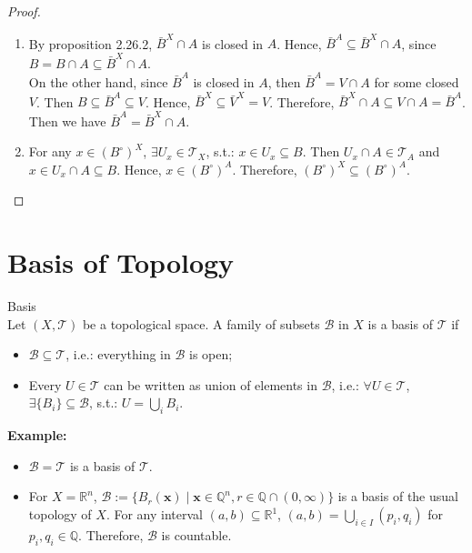 \begin{proof}
    \begin{enumerate}
        \item By proposition 2.26.2, $\bar{B}^X \cap A$ is closed in $A$. Hence, $\bar{B}^A \subseteq \bar{B}^X \cap A$, since $B =B\cap A \subseteq \bar{B}^X \cap A$.\\
        On the other hand, since $\bar{B}^A$ is closed in $A$, then $\bar{B}^A = V\cap A$ for some closed $V$. Then $B \subseteq \bar{B}^A \subseteq V$. Hence, $\bar{B}^X \subseteq \bar{V}^X = V$. Therefore, $\bar{B}^X \cap A \subseteq V \cap A=\bar{B}^A$.\\
        Then we have $\bar{B}^A = \bar{B}^X \cap A$.
        \item For any $x \in (B^\circ)^X$, $\exists U_x \in \mathcal{T}_X$, s.t.: $x\in U_x \subseteq B$. Then $U_x \cap A \in \mathcal{T}_A$ and $x \in U_x \cap A \subseteq B$. Hence, $x \in (B^\circ)^A$. Therefore, $(B^\circ) ^X \subseteq (B^\circ) ^A$.
    \end{enumerate}
\end{proof}

\section{Basis of Topology}

\begin{definition}{Basis}\\
Let $(X, \mathcal{T})$ be a topological space. A family of subsets $\mathcal{B}$ in $X$ is a basis of $\mathcal{T}$ if
\begin{itemize}
    \item $\mathcal{B} \subseteq \mathcal{T}$, i.e.: everything in $\mathcal{B}$ is open;
    \item Every $U \in \mathcal{T}$ can be written as union of elements in $\mathcal{B}$, i.e.: $\forall U \in \mathcal{T}$, $\exists\{B_i\} \subseteq \mathcal{B}$, s.t.: $U= \bigcup_i B_i$.
\end{itemize}
\end{definition}

\noindent\textbf{Example:}
\begin{itemize}
    \item $\mathcal{B}=\mathcal{T}$ is a basis of $\mathcal{T}$.
    \item For $X=\mathbb{R}^n$, $\mathcal{B}:= \{B_r(\mathbf{x}) \mid \mathbf{x} \in \mathbb{Q} ^n, r \in \mathbb{Q}\cap (0,\infty)\}$ is a basis of the usual topology of $X$.
    For any interval $(a,b) \subseteq \mathbb{R}^1$, $(a,b)= \bigcup_{i \in I}(p_i,q_i)$ for $p_i ,q_i \in \mathbb{Q}$. Therefore, $\mathcal{B}$ is countable.
\end{itemize}

